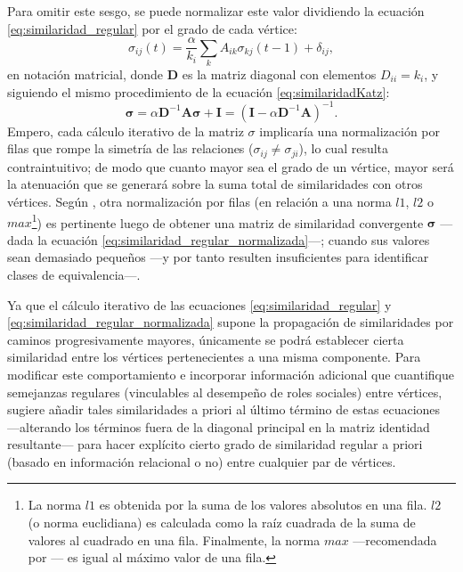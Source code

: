 \documentclass[letterpaper, 11pt]{book}
\theoremstyle{definition}
\theoremstyle{remark}
\begin{document}
Para omitir este sesgo, se puede normalizar este valor dividiendo la ecuación \ref{eq:similaridad_regular} por el grado de cada vértice: 
\begin{equation}\label{eq:similaridad_regular_normalizada}
    \sigma_{ij}(t) = \frac{\alpha}{k_{i}}  \sum_{k} A_{ik} \sigma_{kj}(t-1) + \delta_{ij}, 
\end{equation}
en notación matricial, donde $\mathbf{D}$ es la matriz diagonal con elementos $D_{ii}=k_{i}$, y siguiendo el mismo procedimiento de la ecuación \ref{eq:similaridadKatz}: 
\begin{equation}\label{eq:similaridadKatz_ponderada}
    \mathbf{\sigma} = 
    \alpha \mathbf{D}^{-1}\mathbf{A}\mathbf{\sigma} + \mathbf{I} = 
    (\mathbf{I}-\alpha\mathbf{D}^{-1}\mathbf{A})^{-1}. 
\end{equation}
Empero, cada cálculo iterativo de la matriz $\sigma$ implicaría una normalización por filas que rompe la simetría de las relaciones ($\sigma_{ij} \neq \sigma_{ji}$), lo cual resulta contraintuitivo; de modo que cuanto mayor sea el grado de un vértice, mayor será la atenuación que se generará sobre la suma total de similaridades con otros vértices. 
Según \citet{2018_Duricic_RegularEquivalence}, otra normalización por filas (en relación a una norma $l1$, $l2$ o $max$\footnote{
    La norma $l1$ es obtenida por la suma de los valores absolutos en una fila. 
    $l2$ (o norma euclidiana) es calculada como la raíz cuadrada de la suma de valores al cuadrado en una fila. 
    Finalmente, la norma $max$ ---recomendada por \citet{2018_Duricic_RegularEquivalence}--- es igual al máximo valor de una fila. 
}) es pertinente luego de obtener una matriz de similaridad convergente $\mathbf{\sigma}$ ---dada la ecuación \ref{eq:similaridad_regular_normalizada}---; cuando sus valores sean demasiado pequeños ---y por tanto resulten insuficientes para identificar clases de equivalencia---. 



Ya que el cálculo iterativo de las ecuaciones \ref{eq:similaridad_regular} y \ref{eq:similaridad_regular_normalizada} supone la propagación de similaridades por caminos progresivamente mayores, únicamente se podrá establecer cierta similaridad entre los vértices pertenecientes a una misma componente. 
Para modificar este comportamiento e incorporar información adicional que cuantifique semejanzas regulares (vinculables al desempeño de roles sociales) entre vértices, \citet{2010_Newman_Networks} sugiere añadir tales similaridades a priori al último término de estas ecuaciones ---alterando los términos fuera de la diagonal principal en la matriz identidad resultante--- para hacer explícito cierto grado de similaridad regular a priori (basado en información relacional o no) entre cualquier par de vértices. 
\end{document}
